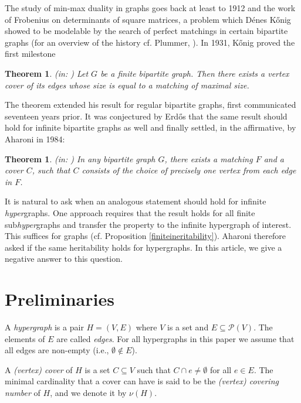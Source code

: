 \documentclass[12pt]{amsart}
\newtheorem{theorem}[lemma]{\bf Theorem}
\newcommand{\Pow}{{\mathcal P}}
\begin{document}
The study of min-max duality in graphs goes back at least to 1912 and the work of Frobenius on determinants of square matrices, a problem which Dénes K\H{o}nig showed to be modelable by the search of perfect matchings in certain bipartite graphs (for an overview of the history cf. Plummer, \cite{Pl}). In 1931, K\H{o}nig proved the first milestone 
\begin{theorem}{(in: \cite{Koe})}
Let $G$ be a finite bipartite graph. Then there exists a vertex cover of its edges whose size is equal to a matching of maximal size.
\end{theorem}
The theorem extended his result for regular bipartite graphs, first communicated seventeen years prior. It was conjectured by Erd\H{o}s that the same result should hold for infinite bipartite graphs as well  and finally settled, in the affirmative, by Aharoni in 1984:
\begin{theorem}{(in: \cite{Ah2})}
In any bipartite graph $G$, there exists a matching $F$ and a cover $C$, such that $C$ consists of the choice of precisely one vertex from each edge in $F$.
\end{theorem}
It is natural to ask when an analogous statement should hold for infinite \textit{hyper}graphs. One approach requires that the result holds for all finite sub\textit{hyper}graphs and transfer the property to the infinite hypergraph of interest. This suffices for graphs (cf. Proposition \ref{finiteineritability}). Aharoni therefore asked if the same heritability holds for hypergraphs. In this article, we give a negative answer to this question.
\section{Preliminaries}

A {\em hypergraph} is a pair $H=(V,E)$
where $V$ is a set and $E\subseteq \Pow(V)$. The elements of
$E$ are called {\em edges}. For all hypergraphs in this
paper we assume that all edges are non-empty (i.e., $\emptyset
\notin E$).

A {\em (vertex) cover} of $H$ is a set
$C\subseteq V$ such that $C \cap e \neq \emptyset$ for all $e\in E$.
The minimal cardinality that a cover can have is said to
be the {\em (vertex) covering number} of $H$, and we denote it by $\nu(H)$.
\end{document}
